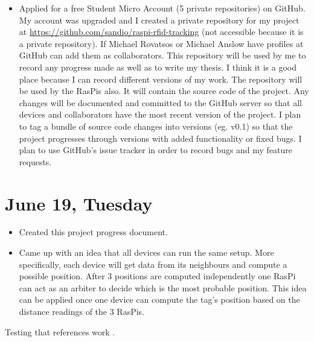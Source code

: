 \documentclass[a4paper,12pt]{article}
\begin{document}
\begin{itemize}
	\item Applied for a free Student Micro Account (5 private repositories) on GitHub. My account was upgraded and I created a private repository for my project at \url{https://github.com/sandio/raspi-rfid-tracking} (not accessible because it is a private repository). If Michael Rovatsos or Michael Anslow have profiles at GitHub can add them as collaborators. This repository will be used by me to record any progress made as well as to write my thesis. I think it is a good place because I can record different versions of my work. The repository will be used by the RasPis also. It will contain the source code of the project. Any changes will be documented and committed to the GitHub server so that all devices and collaborators have the most recent version of the project. I plan to tag a bundle of source code changes into versions (eg. v0.1) so that the project progresses through versions with added functionality or fixed bugs. I plan to use GitHub's issue tracker in order to record bugs and my feature requests.
\end{itemize}

\section{June 19, Tuesday}

\begin{itemize}
	\item Created this project progress document.
	\item Came up with an idea that all devices can run the same setup. More specifically, each device will get data from its neighbours and compute a possible position. After 3 positions are computed independently one RasPi can act as an arbiter to decide which is the most probable position. This idea can be applied once one device can compute the tag's position based on the distance readings of the 3 RasPis.
\end{itemize}

Testing that references work \cite{Stelzer2004}.




\end{document}
